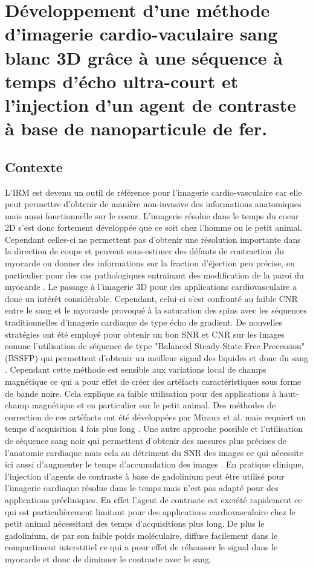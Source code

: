 \chapter{Développement d'une méthode d'imagerie cardio-vaculaire sang blanc 3D grâce à une séquence à temps d'écho ultra-court et l'injection d'un agent de contraste à base de nanoparticule de fer.}

\section{Contexte}

L'IRM est devenu un outil de référence pour l'imagerie cardio-vasculaire car elle peut permettre d'obtenir de manière non-invasive des informations anatomiques mais aussi fonctionnelle sur le coeur. L'imagerie résolue dans le temps du coeur 2D s'est donc fortement développée que ce soit chez l'homme ou le petit animal. 
Cependant celles-ci ne permettent pas d'obtenir une résolution importante dans la direction de coupe et peuvent sous-estimer des défauts de contraction du myocarde ou donner des informations sur la fraction d'éjection peu précise, en particulier pour des cas pathologiques entrainant des modification de la paroi du myocarde \cite{Friedrich:2000aa}.
Le passage à l'imagerie 3D pour des applications cardiovasculaire a donc un intérêt considérable. Cependant, celui-ci s'est confronté au faible CNR entre le sang et le myocarde provoqué à la saturation des spins avec les séquences traditionnelles d'imagerie cardiaque de type écho de gradient. 
De nouvelles stratégies ont été employé pour obtenir un bon SNR et CNR sur les images comme l'utilisation de séquence de type "Balanced Steady-State Free Precession" (BSSFP) qui permettent d'obtenir un meilleur signal des liquides et donc du sang \cite{Nezafat2008Inflow-quantifi}. Cependant cette méthode est sensible aux variations local de champs magnétique ce qui a pour effet de créer des artéfacts caractéristiques sous forme de bande noire. Cela explique sa faible utilisation pour des applications à haut-champ magnétique et en particulier sur le petit animal. Des méthodes de correction de ces artéfacts ont été développées par Miraux et al. mais requiert un temps d'acquisition 4 fois plus long \cite{Miraux:2008sf}. Une autre approche possible et l'utilisation de séquence sang noir qui permettent d'obtenir des mesures plus précises de l'anatomie cardiaque \cite{Berr2005Black-blood-gra} mais cela au détriment du SNR des images ce qui nécessite ici aussi d'augmenter le temps d'accumulation des images \cite{Miraux:2009rm}.
En pratique clinique, l'injection d'agents de contraste à base de gadolinium peut être utilisé pour l'imagerie cardiaque résolue dans le temps mais n'est pas adapté pour des applications précliniques. En effet l'agent de contraste est excrété rapidement ce qui est particulièrement limitant pour des applications cardiovasculaire chez le petit animal nécessitant des temps d'acquisitions plus long. De plus le gadolinium, de par son faible poids moléculaire, diffuse facilement dans le compartiment interstitiel ce qui a pour effet de réhausser le signal dans le myocarde et donc de diminuer le contraste avec le sang.

